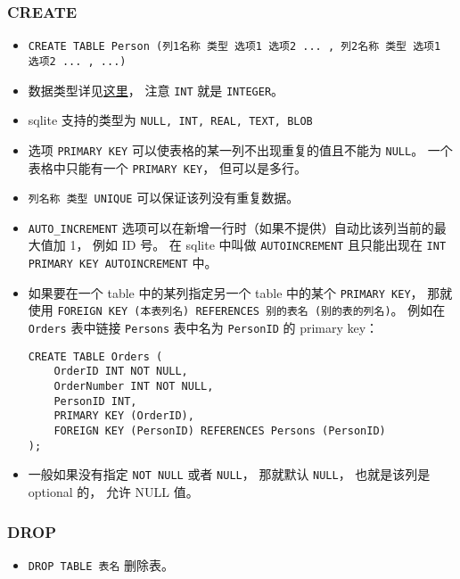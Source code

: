 \subsubsection{CREATE}
\begin{itemize}
\item \verb|CREATE TABLE Person (列1名称 类型 选项1 选项2 ... , 列2名称 类型 选项1 选项2 ... , ...)|
\item 数据类型详见\href{https://www.w3schools.com/sql/sql_datatypes.asp}{这里}， 注意 \verb|INT| 就是 \verb|INTEGER|。
\item sqlite 支持的类型为 \verb|NULL, INT, REAL, TEXT, BLOB|
\item 选项 \verb|PRIMARY KEY| 可以使表格的某一列不出现重复的值且不能为 \verb|NULL|。 一个表格中只能有一个 \verb|PRIMARY KEY|， 但可以是多行。
\item \verb|列名称 类型 UNIQUE| 可以保证该列没有重复数据。
\item \verb|AUTO_INCREMENT| 选项可以在新增一行时（如果不提供）自动比该列当前的最大值加 1， 例如 ID 号。 在 sqlite 中叫做 \verb|AUTOINCREMENT| 且只能出现在 \verb|INT PRIMARY KEY AUTOINCREMENT| 中。
\item 如果要在一个 table 中的某列指定另一个 table 中的某个 \verb|PRIMARY KEY|， 那就使用 \verb|FOREIGN KEY (本表列名) REFERENCES 别的表名 (别的表的列名)|。 例如在 \verb|Orders| 表中链接 \verb|Persons| 表中名为 \verb|PersonID| 的 primary key：
\begin{lstlisting}[language=none]
CREATE TABLE Orders (
    OrderID INT NOT NULL,
    OrderNumber INT NOT NULL,
    PersonID INT,
    PRIMARY KEY (OrderID),
    FOREIGN KEY (PersonID) REFERENCES Persons (PersonID)
);
\end{lstlisting}
\item 一般如果没有指定 \verb|NOT NULL| 或者 \verb|NULL|， 那就默认 \verb|NULL|， 也就是该列是 optional 的， 允许 NULL 值。
\end{itemize}

\subsubsection{DROP}
\begin{itemize}
\item \verb|DROP TABLE 表名| 删除表。
\end{itemize}

